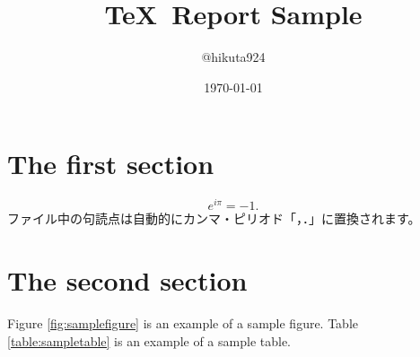 
\title{\TeX\ Report Sample}
\author{@hikuta924}
\date{\today}

\maketitle

\section{The first section}
\begin{equation}
	e^{i \pi} = -1.
\end{equation}
ファイル中の句読点は自動的にカンマ・ピリオド「，．」に置換されます。

\section{The second section}
Figure \ref{fig:samplefigure} is an example of a sample figure.
Table \ref{table:sampletable} is an example of a sample table.


\cite{Sam2014}



